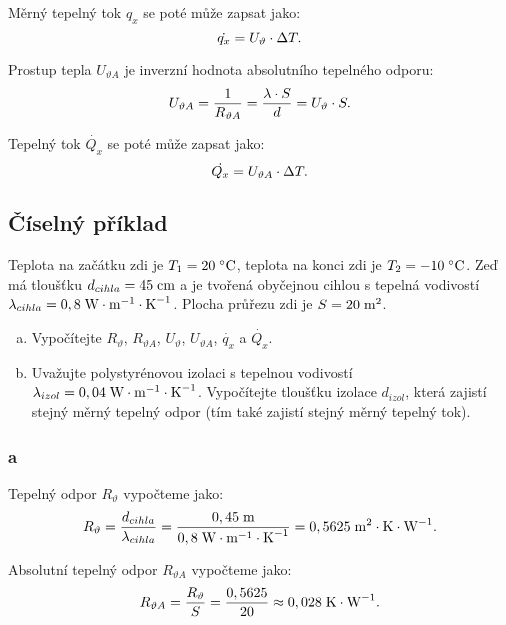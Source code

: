 \documentclass{article}
\begin{document}
Měrný tepelný tok $q_x$ se poté může zapsat jako:
\begin{equation}
    \dot{q_x} = U_\vartheta \cdot \Delta T.
    \unit{(\ueqWandMinvsq)}
\end{equation}

Prostup tepla $U_{\vartheta A}$ je inverzní hodnota absolutního tepelného odporu:
\begin{equation}
    U_{\vartheta A} = \frac{1}{R_{\vartheta A}} = \frac{\lambda \cdot S}{d} = U_\vartheta \cdot S.
    \unit{(\ueqWandKinv)}
\end{equation}

Tepelný tok $\dot{Q_x}$ se poté může zapsat jako:
\begin{equation}
    \dot{Q_x} = U_{\vartheta A} \cdot \Delta T.
    \unit{(\ueqW)}
\end{equation}



\subsection{Číselný příklad}
Teplota na začátku zdi je $T_1 = 20 \; ^\circ \textrm{C}$, teplota na konci zdi je $T_2 = -10 \; ^\circ \textrm{C}$. Zeď má tloušťku $d_{cihla} = 45 \; \textrm{cm}$ a je tvořená obyčejnou cihlou s tepelná vodivostí $\lambda_{cihla} = 0,8 \; \textrm{W} \cdot \textrm{m}^{-1} \cdot \textrm{K}^{-1}$. Plocha průřezu zdi je $S = 20 \; \textrm{m}^{\textrm{2}}$.

\begin{enumerate}[a)]
    \item Vypočítejte $R_{\vartheta}$, $R_{\vartheta A}$, $U_\vartheta$, $U_{\vartheta A}$, $\dot{q_x}$ a $\dot{Q_x}$.
    \item Uvažujte polystyrénovou izolaci s tepelnou vodivostí $\lambda_{izol} = 0,04 \; \textrm{W} \cdot \textrm{m}^{-1} \cdot \textrm{K}^{-1}$. Vypočítejte tloušťku izolace $d_{izol}$, která zajistí stejný měrný tepelný odpor (tím také zajistí stejný měrný tepelný tok).
\end{enumerate}

\subsubsection{a}
Tepelný odpor $R_{\vartheta}$ vypočteme jako:
$$
    R_{\vartheta} = \frac{d_{cihla}}{\lambda_{cihla}} = \frac{0,45 \; \textrm{m}}{0,8 \; \textrm{W} \cdot \textrm{m}^{-1} \cdot \textrm{K}^{-1}} = 0,5625 \; \textrm{m}^{\textrm{2}} \cdot \textrm{K} \cdot \textrm{W}^{-1}.
$$

Absolutní tepelný odpor $R_{\vartheta A}$ vypočteme jako:
$$
    R_{\vartheta A} = \frac{R_{\vartheta}}{S} = \frac{0,5625}{20} \approx 0,028 \; \textrm{K} \cdot \textrm{W}^{-1}.
$$
\end{document}
